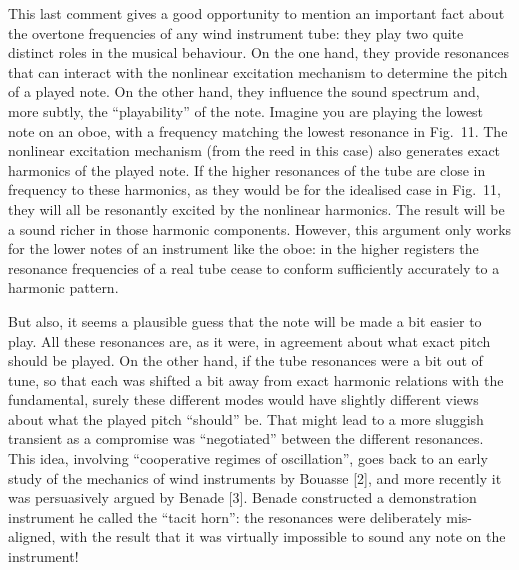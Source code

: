 
  This last comment gives a good opportunity to mention an important fact about 
  the overtone frequencies of any wind instrument tube: they play two quite 
  distinct roles in the musical behaviour. On the one hand, they provide 
  resonances that can interact with the nonlinear excitation mechanism to 
  determine the pitch of a played note. On the other hand, they influence the 
  sound spectrum and, more subtly, the “playability” of the note. Imagine you 
  are playing the lowest note on an oboe, with a frequency matching the lowest 
  resonance in Fig.\ 11. The nonlinear excitation mechanism (from the reed in 
  this case) also generates exact harmonics of the played note. If the higher 
  resonances of the tube are close in frequency to these harmonics, as they 
  would be for the idealised case in Fig.\ 11, they will all be resonantly 
  excited by the nonlinear harmonics. The result will be a sound richer in 
  those harmonic components. However, this argument only works for the lower 
  notes of an instrument like the oboe: in the higher registers the resonance 
  frequencies of a real tube cease to conform sufficiently accurately to a 
  harmonic pattern. 

  But also, it seems a plausible guess that the note will be made a bit easier 
  to play. All these resonances are, as it were, in agreement about what exact 
  pitch should be played. On the other hand, if the tube resonances were a bit 
  out of tune, so that each was shifted a bit away from exact harmonic 
  relations with the fundamental, surely these different modes would have 
  slightly different views about what the played pitch “should” be. That might 
  lead to a more sluggish transient as a compromise was “negotiated” between 
  the different resonances. This idea, involving “cooperative regimes of 
  oscillation”, goes back to an early study of the mechanics of wind 
  instruments by Bouasse [2], and more recently it was persuasively argued by 
  Benade [3]. Benade constructed a demonstration instrument he called the 
  “tacit horn”: the resonances were deliberately mis-aligned, with the result 
  that it was virtually impossible to sound any note on the instrument! 

